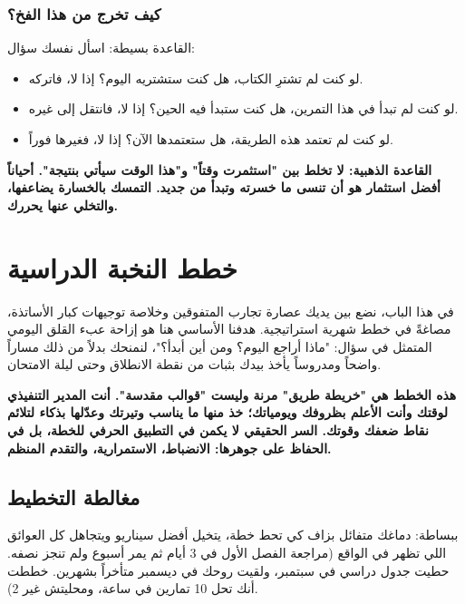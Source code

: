 \documentclass[12pt,a4paper]{book}
\newcommand{\importantAr}[1]{%
	\begin{important}
		\bfseries #1
	\end{important}
}
\begin{document}
\subsection*{كيف تخرج من هذا الفخ؟}

القاعدة بسيطة: اسأل نفسك سؤال:

\begin{itemize}
	\item لو كنت لم تشترِ الكتاب، هل كنت ستشتريه اليوم؟ إذا لا، فاتركه.
	\item لو كنت لم تبدأ في هذا التمرين، هل كنت ستبدأ فيه الحين؟ إذا لا، فانتقل إلى غيره.
	\item لو كنت لم تعتمد هذه الطريقة، هل ستعتمدها الآن؟ إذا لا، فغيرها فوراً.
\end{itemize}

\importantAr{القاعدة الذهبية: لا تخلط بين "استثمرت وقتاً" و"هذا الوقت سيأتي بنتيجة". أحياناً أفضل استثمار هو أن تنسى ما خسرته وتبدأ من جديد. التمسك بالخسارة يضاعفها، والتخلي عنها يحررك.}
	
	
	\chapter{خطط النخبة الدراسية}
	\label{chap:plans}
	
	
	في هذا الباب، نضع بين يديك عصارة تجارب المتفوقين وخلاصة توجيهات كبار الأساتذة، مصاغةً في خطط شهرية استراتيجية. هدفنا الأساسي هنا هو إزاحة عبء القلق اليومي المتمثل في سؤال: "ماذا أراجع اليوم؟ ومن أين أبدأ؟"، لنمنحك بدلاً من ذلك مساراً واضحاً ومدروساً يأخذ بيدك بثبات من نقطة الانطلاق وحتى ليلة الامتحان.
	
	\importantAr{هذه الخطط هي "خريطة طريق" مرنة وليست "قوالب مقدسة". أنت المدير التنفيذي لوقتك وأنت الأعلم بظروفك ويومياتك؛ خذ منها ما يناسب وتيرتك وعدّلها بذكاء لتلائم نقاط ضعفك وقوتك. السر الحقيقي لا يكمن في التطبيق الحرفي للخطة، بل في الحفاظ على جوهرها: الانضباط، الاستمرارية، والتقدم المنظم.}
	
	
\section{مغالطة التخطيط}
\label{sec:planning-fallacy}

ببساطة: دماغك متفائل بزاف كي تحط خطة، يتخيل أفضل سيناريو ويتجاهل كل العوائق اللي تظهر في الواقع (مراجعة الفصل الأول في 3 أيام ثم يمر أسبوع ولم تنجز نصفه. حطيت جدول دراسي في سبتمبر، ولقيت روحك في ديسمبر متأخراً بشهرين. خططت أنك تحل 10 تمارين في ساعة، ومحليتش غير 2).
\end{document}
